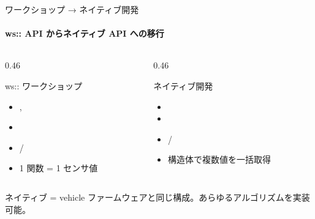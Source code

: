 \documentclass[aspectratio=169, 14pt]{beamer}
\begin{document}
\begin{frame}[fragile]{ワークショップ → ネイティブ開発}
  \framesubtitle{ws:: API からネイティブ API への移行}
  \begin{columns}[t]
    \begin{column}{0.46\textwidth}
      \begin{exampleblock}{ws:: ワークショップ}
        {\scriptsize
        \begin{itemize}
          \item {}, 
          \item {}
          \item {} / 
          \item 1 関数 = 1 センサ値
        \end{itemize}
        }
      \end{exampleblock}
    \end{column}
    \begin{column}{0.46\textwidth}
      \begin{block}{ネイティブ開発}
        {\scriptsize
        \begin{itemize}
          \item {}
          \item {}
          \item {} / 
          \item 構造体で複数値を一括取得
        \end{itemize}
        }
      \end{block}
    \end{column}
  \end{columns}

  \vspace{0.5em}
  {\footnotesize
    ネイティブ = vehicle ファームウェアと同じ構成。あらゆるアルゴリズムを実装可能。
  }
\end{frame}
\end{document}
